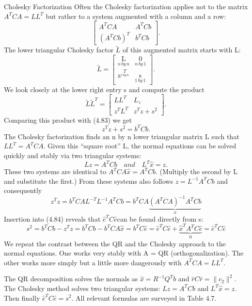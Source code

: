 Cholesky Factorization Often the Cholesky factorization applies not to the matrix $A^TCA=LL^T$ but rather to a system augmented with a column and a row:
\begin{equation}
\begin{bmatrix}
A^TCA  &A^TCb\\
(A^TCb)^T & b^TCb
\end{bmatrix}.
\end{equation}
The lower triangular Cholesky factor $\tilde{L}$ of this augmented matrix starts with L:
\begin{equation*}
\tilde{L}=
\begin{bmatrix}
\mathop L\limits_{n\,by\,n} & \mathop 0\limits_{n\,by\,1}\\
\mathop z^T\limits_{1\,by\,n} & \mathop s\limits_{1\,by\,1}
\end{bmatrix}.
\end{equation*} 
We look closely at the lower right entry s and compute the product
\begin{equation*}
\tilde{L}\tilde{L}^T=
\begin{bmatrix}
LL^T & L_z\\
z^TL^T & z^Tz+s^2
\end{bmatrix}.
\end{equation*} 
Comparing this product with (4.83) we get
\begin{equation}
z^Tz+s^2=b^TCb.
\end{equation}
The Cholesky factorization finds an n by n lower triangular matrix L such that $LL^T=A^TCA$. Given this “square root” L, the normal equations can be solved quickly and stably via two triangular systems:
\begin{equation*}
Lz=A^TCb \quad and \quad L^T\hat{x}=z.
\end{equation*} 
These two systems are identical to $A^TCA\hat{x}=A^TCb$. (Multiply the second by L and
substitute the first.) From these systems also follows $z=L^{-1}A^TCb$ and consequently
\begin{equation}
z^Tz=b^TCAL^{-T}L^{-1}A^TCb=b^TCA\underbrace{(A^TCA)^{-1}A^TCb}_x
\end{equation}
Insertion into (4.84) reveals that $\hat{e}^TC\hat{e}$can be found directly from s:
\begin{equation}
s^2=b^TCb-z^Tz=b^TCb-b^TCA\hat{x}=b^TC\hat{e}=\hat{e}^TC\hat{e}+\underbrace{\hat{x}^TA^TC\hat{e}}_0=\hat{e}^TC\hat{e}
\end{equation}
We repeat the contrast between the QR and the Cholesky approach to the normal equations.
One works very stably with A = QR (orthogonalization). The other works more simply
but a little more dangerously with $A^TCA=LL^T$.

The QR decomposition solves the normals as $\hat{x}=R^{-1}Q^Tb$ and $\hat{r}C\hat{r}=\|c_2\|^2$. The
Cholesky method solves two triangular systems: $Lz=A^TCb$ and $L^T\hat{x}=z$. Then finally
$\hat{e}^TC\hat{e}=s^2$. All relevant formulas are surveyed in Table 4.7.
  
